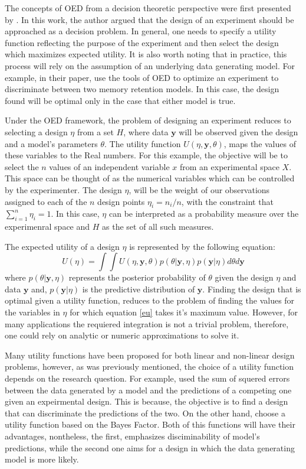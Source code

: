 \documentclass[preprint,review,12pt]{elsarticle}
\begin{document}
The concepts of OED from a decision theoretic perspective were first presented by \citet{Lindley1972}. In this work, the author argued that the design of an experiment should be approached as a decision problem. In general, one needs to specify a utility function reflecting the purpose of the experiment and then select the design which maximizes expected utility. It is also worth noting that in practice, this process will rely on the assumption of an underlying data generating model. For example, in their paper, \citet{Myung2009} use the tools of OED to optimize an experiment to discriminate between two memory retention models. In this case, the design found will be optimal only in the case that either model is true.

Under the OED framework, the problem of designing an experiment reduces to selecting a design $\eta$ from a set $H$, where data $\mathbf{y}$ will be observed given the design and a model's parameters $\theta$. The utility function $U(\eta,\mathbf{y},\theta)$, maps the values of these variables to the Real numbers. For this example, the objective will be to select the $n$ values of an independent variable $x$ from an experimental space $X$. This space can be thought of as the numerical variables which can be controlled by the experimenter. The design $\eta$, will be the weight of our observations assigned to each of the $n$ design points $\eta_i=n_i/n$, with the constraint that  $\sum_{i=1}^{n}\eta_i = 1$. In this case, $\eta$ can be interpreted as a probability measure over the experimenral space and $H$ as the set of all such measures.

The expected utility of a design $\eta$ is represented by the following equation:
\begin{equation}
U(\eta)=\int \int U(\eta,\mathbf{y},\theta)p(\theta|\mathbf{y},\eta)p(\mathbf{y}|\eta) d\theta d\mathbf{y}
\label{eu}
\end{equation}
where $p(\theta|\mathbf{y},\eta)$ represents the posterior probability of $\theta$ given the design $\eta$ and data $\mathbf{y}$ and, $p(\mathbf{y}|\eta)$ is the predictive distribution of $\mathbf{y}$. Finding the design that is optimal given a utility function, reduces to the problem of finding the values for the variables in $\eta$ for which equation \ref{eu} takes it's maximum value. However, for many applications the requiered integration is not a trivial problem, therefore, one could rely on analytic or numeric approximations to solve it.

Many utility functions have been proposed for both linear and non-linear design problems, however, as was previously mentioned, the choice of a utility function depends on the research question. For example, \cite{Myung2009} used the sum of squered errors between the data generated by a model and the predictions of a competing one given an expeirmental design. This is because, the objective is to find a design that can discriminate the predictions of the two. On the other hand, \cite{ZL2010} choose a utility function based on the Bayes Factor. Both of this functions will have their advantages, nontheless, the first, emphasizes disciminability of model's predictions, while the second one aims for a design in which the data generating model is more likely.
\end{document}
